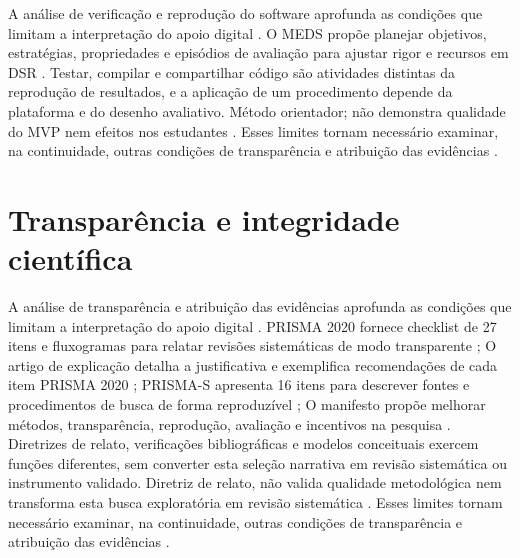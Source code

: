 A análise de verificação e reprodução do software aprofunda as condições que limitam a interpretação do apoio digital \citep{eng20}. O MEDS propõe planejar objetivos, estratégias, propriedades e episódios de avaliação para ajustar rigor e recursos em DSR \citep{eng20}. Testar, compilar e compartilhar código são atividades distintas da reprodução de resultados, e a aplicação de um procedimento depende da plataforma e do desenho avaliativo. Método orientador; não demonstra qualidade do MVP nem efeitos nos estudantes \citep{eng20}. Esses limites tornam necessário examinar, na continuidade, outras condições de transparência e atribuição das evidências \citep{eng20}.

\clearpage\section{Transparência e integridade científica}

A análise de transparência e atribuição das evidências aprofunda as condições que limitam a interpretação do apoio digital \citep{SU01} \citep{SU02} \citep{SU03} \citep{SU04}. PRISMA 2020 fornece checklist de 27 itens e fluxogramas para relatar revisões sistemáticas de modo transparente \citep{SU01}; O artigo de explicação detalha a justificativa e exemplifica recomendações de cada item PRISMA 2020 \citep{SU02}; PRISMA-S apresenta 16 itens para descrever fontes e procedimentos de busca de forma reproduzível \citep{SU03}; O manifesto propõe melhorar métodos, transparência, reprodução, avaliação e incentivos na pesquisa \citep{SU04}. Diretrizes de relato, verificações bibliográficas e modelos conceituais exercem funções diferentes, sem converter esta seleção narrativa em revisão sistemática ou instrumento validado. Diretriz de relato, não valida qualidade metodológica nem transforma esta busca exploratória em revisão sistemática \citep{SU01} \citep{SU02} \citep{SU03} \citep{SU04}. Esses limites tornam necessário examinar, na continuidade, outras condições de transparência e atribuição das evidências \citep{SU01} \citep{SU02} \citep{SU03} \citep{SU04}.

